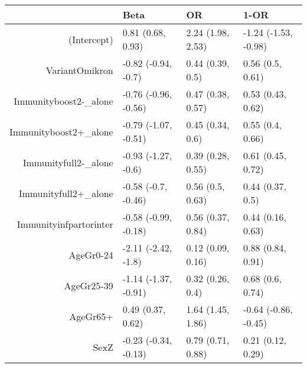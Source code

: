 \begin{table}[ht]
\centering
\begin{tabular}{rlll}
  \hline
 & Beta & OR & 1-OR \\ 
  \hline
(Intercept) & 0.81 (0.68, 0.93) & 2.24 (1.98, 2.53) & -1.24 (-1.53, -0.98) \\ 
  VariantOmikron & -0.82 (-0.94, -0.7) & 0.44 (0.39, 0.5) & 0.56 (0.5, 0.61) \\ 
  Immunityboost2-\_alone & -0.76 (-0.96, -0.56) & 0.47 (0.38, 0.57) & 0.53 (0.43, 0.62) \\ 
  Immunityboost2+\_alone & -0.79 (-1.07, -0.51) & 0.45 (0.34, 0.6) & 0.55 (0.4, 0.66) \\ 
  Immunityfull2-\_alone & -0.93 (-1.27, -0.6) & 0.39 (0.28, 0.55) & 0.61 (0.45, 0.72) \\ 
  Immunityfull2+\_alone & -0.58 (-0.7, -0.46) & 0.56 (0.5, 0.63) & 0.44 (0.37, 0.5) \\ 
  Immunityinfpartorinter & -0.58 (-0.99, -0.18) & 0.56 (0.37, 0.84) & 0.44 (0.16, 0.63) \\ 
  AgeGr0-24 & -2.11 (-2.42, -1.8) & 0.12 (0.09, 0.16) & 0.88 (0.84, 0.91) \\ 
  AgeGr25-39 & -1.14 (-1.37, -0.91) & 0.32 (0.26, 0.4) & 0.68 (0.6, 0.74) \\ 
  AgeGr65+ & 0.49 (0.37, 0.62) & 1.64 (1.45, 1.86) & -0.64 (-0.86, -0.45) \\ 
  SexZ & -0.23 (-0.34, -0.13) & 0.79 (0.71, 0.88) & 0.21 (0.12, 0.29) \\ 
   \hline
\end{tabular}
\end{table}
